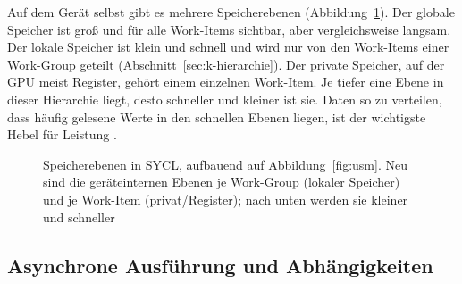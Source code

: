 \documentclass[12pt,a4paper]{article}
\begin{document}
Auf dem Gerät selbst gibt es mehrere Speicherebenen
(Abbildung~\ref{fig:speicher}). Der globale Speicher ist groß und für alle
Work-Items sichtbar, aber vergleichsweise langsam. Der lokale Speicher ist klein
und schnell und wird nur von den Work-Items einer Work-Group geteilt
(Abschnitt~\ref{sec:k-hierarchie}). Der private Speicher, auf der GPU meist
Register, gehört einem einzelnen Work-Item. Je tiefer eine Ebene in dieser
Hierarchie liegt, desto schneller und kleiner ist sie. Daten so zu verteilen,
dass häufig gelesene Werte in den schnellen Ebenen liegen, ist der wichtigste
Hebel für Leistung \cite{hwu2022pmpp}.

\begin{figure}[htbp]
\centering
{}
\caption[Speicherebenen in SYCL]{Speicherebenen in SYCL, aufbauend auf Abbildung~\ref{fig:usm}. Neu sind die geräteinternen Ebenen je Work-Group (lokaler Speicher) und je Work-Item (privat/Register); nach unten werden sie kleiner und schneller}
\label{fig:speicher}
\end{figure}

\subsection{Asynchrone Ausführung und Abhängigkeiten}\label{sec:k-abhaengigkeiten}
\end{document}
